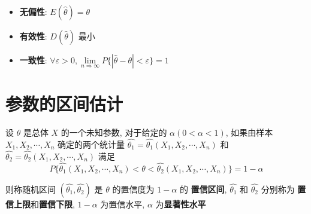 \begin{corollary}[估计量评价标准]
	\begin{itemize}
		\item \textbf{无偏性}: $E(\hat{\theta}) = \theta$
		\item \textbf{有效性}: $D(\hat{\theta})$ 最小
		\item \textbf{一致性}: $\forall \varepsilon > 0, \lim\limits_{n\Rightarrow \infty}P\{|\hat{\theta}-\theta|<\varepsilon\} = 1$
	\end{itemize}
\end{corollary}

\section{参数的区间估计}

\begin{definition}[区间估计和置信区间]
	设 $\theta$ 是总体 $X$ 的一个未知参数, 对于给定的 $\alpha(0 < \alpha < 1)$, 如果由样本 $X_{1},X_{2},\cdots,X_{n}$ 确定的两个统计量 
	$\hat{\theta_{1}} = \hat{\theta_{1}}(X_{1},X_{2},\cdots,X_{n})$ 和 $\hat{\theta_{2}} = \hat{\theta_{2}}(X_{1},X_{2},\cdots,X_{n})$ 满足 
	$$P\{\hat{\theta_{1}}(X_{1},X_{2},\cdots,X_{n}) < \theta < \hat{\theta_{2}}(X_{1},X_{2},\cdots,X_{n})\} = 1-\alpha$$
	
	则称随机区间 $(\hat{\theta_{1}},\hat{\theta_{2}})$ 是 $\theta$ 的置信度为 $1-\alpha$ 的 \textbf{置信区间},
	$\hat{\theta_{1}}$ 和 $\hat{\theta_{2}}$ 分别称为 \textbf{置信上限}和\textbf{置信下限}, $1-\alpha$ 为置信水平, $\alpha$ 为\textbf{显著性水平}
\end{definition}

